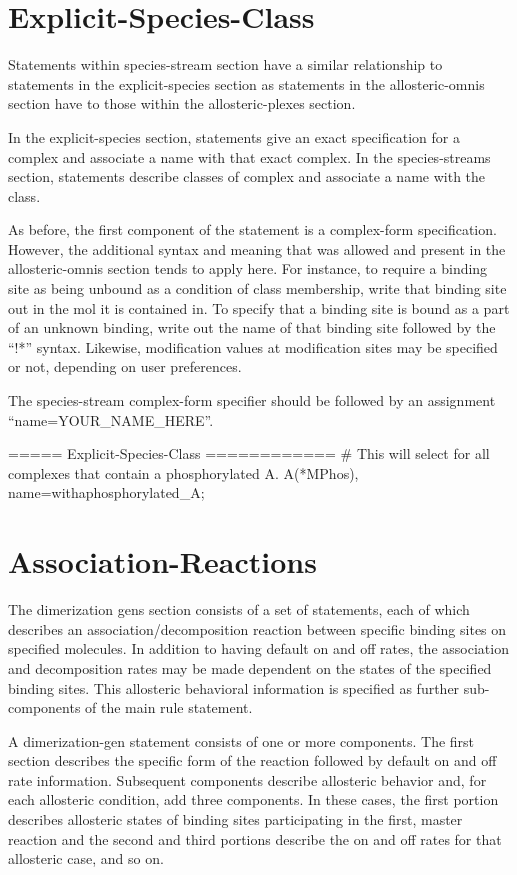 \section{Explicit-Species-Class}
Statements within species-stream section have a similar relationship
to statements in the explicit-species section as statements in the
allosteric-omnis section have to those within the allosteric-plexes section.

In the explicit-species section, statements give an exact
specification for a complex and associate a name with that exact
complex.  In the species-streams section, statements describe classes
of complex and associate a name with the class.

As before, the first component of the statement is a complex-form
specification.  However, the additional syntax and meaning that was
allowed and present in the allosteric-omnis section tends to apply
here.  For instance, to require a binding site as being unbound as a
condition of class membership, write that binding site out in the mol
it is contained in.  To specify that a binding site is bound as a part
of an unknown binding, write out the name of that binding site
followed by the ``!*'' syntax. Likewise, modification values at
modification sites may be specified or not, depending on user
preferences.  

The species-stream complex-form specifier should be followed by an assignment
``name=YOUR\_NAME\_HERE''.

\begin{ExampleMZR}
===== Explicit-Species-Class ============
# This will select for all complexes that contain a phosphorylated A.
A(*M{Phos}), 
       name=withaphosphorylated\_A;

\end{ExampleMZR}


\section{Association-Reactions}
The dimerization gens section consists of a set of statements, each of
which describes an association/decomposition reaction between specific
binding sites on specified molecules.  In addition to having default on and
off rates, the association and decomposition rates may be made
dependent on the states of the specified binding sites.  This
allosteric behavioral information is specified as further
sub-components of the main rule statement.  

A dimerization-gen statement consists of one or more components.  The
first section describes the specific form of the reaction followed by
default on and off rate information.  Subsequent components describe
allosteric behavior and, for each allosteric condition, add three
components. In these cases, the first portion describes allosteric
states of binding sites participating in the first, master reaction
and the second and third portions describe the on and off rates for
that allosteric case, and so on.

